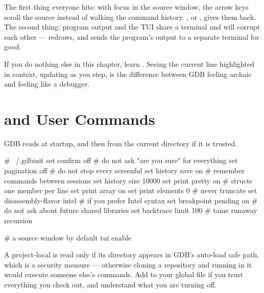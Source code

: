 \begin{note}
	The first thing everyone hits: with focus in the source window, the arrow keys
	scroll the source instead of walking the command history. , or
	 , gives them back. The second thing: program output and the
	TUI share a terminal and will corrupt each other ---  redraws, and
	 sends the program's output to a separate
	terminal for good.
\end{note}

\begin{moral}
	If you do nothing else in this chapter, learn  . Seeing the
	current line highlighted in context, updating as you step, is the difference
	between GDB feeling archaic and feeling like a debugger.
\end{moral}

\section{\texorpdfstring{ and User Commands}{.gdbinit and User Commands}}\label{sec:gdb-gdbinit}

GDB reads  at startup, and then 
from the current directory if it is trusted.

\begin{gdbcode}
# ~/.gdbinit
set confirm off                  # do not ask "are you sure" for everything
set pagination off               # do not stop every screenful
set history save on              # remember commands between sessions
set history size 10000
set print pretty on              # structs one member per line
set print array on
set print elements 0             # never truncate
set disassembly-flavor intel     # if you prefer Intel syntax
set breakpoint pending on        # do not ask about future shared libraries
set backtrace limit 100          # tame runaway recursion

# a source window by default
tui enable
\end{gdbcode}

\begin{note}
	A project-local  is read only if its directory appears in GDB's
	auto-load safe path, which is a security measure --- otherwise
	cloning a repository and running  in it would execute someone else's
	commands. Add  to your global file if you trust
	everything you check out, and understand what you are turning off.
\end{note}

